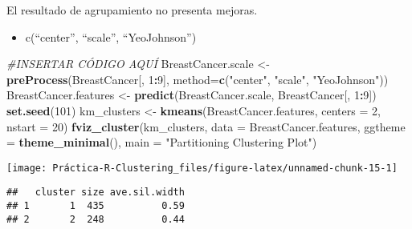 \documentclass[
]{article}
\newenvironment{Shaded}{\begin{snugshade}}{\end{snugshade}}
\newcommand{\CommentTok}[1]{\textcolor[rgb]{0.56,0.35,0.01}{\textit{#1}}}
\newcommand{\DataTypeTok}[1]{\textcolor[rgb]{0.13,0.29,0.53}{#1}}
\newcommand{\DecValTok}[1]{\textcolor[rgb]{0.00,0.00,0.81}{#1}}
\newcommand{\KeywordTok}[1]{\textcolor[rgb]{0.13,0.29,0.53}{\textbf{#1}}}
\newcommand{\NormalTok}[1]{#1}
\newcommand{\OperatorTok}[1]{\textcolor[rgb]{0.81,0.36,0.00}{\textbf{#1}}}
\newcommand{\StringTok}[1]{\textcolor[rgb]{0.31,0.60,0.02}{#1}}
\providecommand{\tightlist}{%
  \setlength{\itemsep}{0pt}\setlength{\parskip}{0pt}}
\begin{document}
El resultado de agrupamiento no presenta mejoras.

\begin{itemize}
\tightlist
\item
  c(``center'', ``scale'', ``YeoJohnson'')
\end{itemize}

\begin{Shaded}
\begin{Highlighting}[]
\CommentTok{#INSERTAR CÓDIGO AQUÍ}
\NormalTok{BreastCancer.scale <-}\StringTok{ }\KeywordTok{preProcess}\NormalTok{(BreastCancer[, }\DecValTok{1}\OperatorTok{:}\DecValTok{9}\NormalTok{], }\DataTypeTok{method=}\KeywordTok{c}\NormalTok{(}\StringTok{"center"}\NormalTok{, }\StringTok{"scale"}\NormalTok{, }\StringTok{"YeoJohnson"}\NormalTok{))}
\NormalTok{BreastCancer.features <-}\StringTok{ }\KeywordTok{predict}\NormalTok{(BreastCancer.scale, BreastCancer[, }\DecValTok{1}\OperatorTok{:}\DecValTok{9}\NormalTok{])}
\KeywordTok{set.seed}\NormalTok{(}\DecValTok{101}\NormalTok{)}
\NormalTok{km_clusters <-}\StringTok{ }\KeywordTok{kmeans}\NormalTok{(BreastCancer.features, }\DataTypeTok{centers =} \DecValTok{2}\NormalTok{, }\DataTypeTok{nstart =} \DecValTok{20}\NormalTok{)}
\KeywordTok{fviz_cluster}\NormalTok{(km_clusters, }\DataTypeTok{data =}\NormalTok{ BreastCancer.features,}
             \DataTypeTok{ggtheme =} \KeywordTok{theme_minimal}\NormalTok{(),}
             \DataTypeTok{main =} \StringTok{"Partitioning Clustering Plot"}\NormalTok{)}
\end{Highlighting}
\end{Shaded}

\begin{center}\texttt{[image: Práctica-R-Clustering\_files/figure-latex/unnamed-chunk-15-1]} \end{center}

\begin{Shaded}
\end{Shaded}

\begin{verbatim}
##   cluster size ave.sil.width
## 1       1  435          0.59
## 2       2  248          0.44
\end{verbatim}
\end{document}
